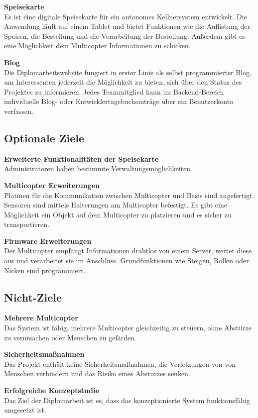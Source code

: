  \textbf{Speisekarte}\\
  Es ist eine digitale Speisekarte für ein autonomes Kellnersystem entwickelt.
  Die Anwendung läuft auf einem Tablet und bietet Funktionen wie die Auflistung der Speisen,
  die Bestellung und die Verarbeitung der Bestellung.
  Außerdem gibt es eine Möglichkeit dem Multicopter Informationen zu schicken.

  \textbf{Blog}\\
  Die Diplomarbeitswebsite fungiert in erster Linie als selbst programmierter Blog, um Interessenten
  jederzeit die Möglichkeit zu bieten, sich über den Status des Projektes zu informieren. Jedes Teammitglied
  kann im Backend-Bereich individuelle Blog- oder Entwicklertagebucheinträge über ein Benutzerkonto verfassen.

  \subsection{Optionale Ziele}
  \textbf{Erweiterte Funktionalitäten der Speisekarte}\\
  Administratoren haben bestimmte Verwaltungsmöglichkeiten.

  \textbf{Multicopter Erweiterungen}\\
  Platinen für die Kommunikation zwischen Multicopter und Basis sind angefertigt.
  Sensoren sind mittels Halterungen am Multicopter befestigt.
  Es gibt eine Möglichkeit ein Objekt auf dem Multicopter zu platzieren und es sicher zu transportieren.

  \textbf{Firmware Erweiterungen}\\
  Der Multicopter empfängt Informationen drahtlos von einem Server,
  wertet diese aus und verarbeitet sie im Anschluss.
  Grundfunktionen wie Steigen, Rollen oder Nicken sind programmiert.

  \subsection{Nicht-Ziele}
  \textbf{Mehrere Multicopter}\\
  Das System ist fähig, mehrere Multicopter gleichzeitig zu steuern, ohne Abstürze
  zu verursachen oder Menschen zu gefärden.

  \textbf{Sicherheitsmaßnahmen}\\
  Das Projekt enthält keine Sicherheitsmaßnahmen, die Verletzungen von von Menschen
  verhindern und das Risiko eines Absturzes senken.

  \textbf{Erfolgreiche Konzeptstudie}\\
  Das Ziel der Diplomarbeit ist es, dass das konzeptionierte System
  funktionsfähig umgesetzt ist.

